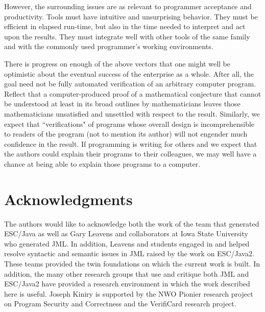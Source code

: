 \documentclass{acm_proc_article-sp}
\begin{document}
However, the surrounding issues are as relevant to programmer acceptance and
productivity.  Tools must have intuitive and unsurprising behavior. They must be efficient
in elapsed run-time, but also in the time needed to interpret and act upon the results.
They must integrate well with other tools of the same family and with the commonly used
programmer's working environments. 

There is progress on enough of the above vectors that one might well be optimistic about the
eventual success of the enterprise as a whole.  After all, the goal need not be fully
automated verification of an
arbitrary computer program.  Reflect that a computer-produced proof
of a mathematical conjecture that cannot be understood at least in its broad outlines by
mathematicians leaves those mathematicians unsatisfied and unsettled with respect to the
result.  Similarly, we expect that ``verifications" of programs whose overall
design is incomprehensible
to readers of the program (not to mention its author) will not engender much confidence
in the result.  If programming is writing for others and we expect that the authors could 
explain their programs to their colleagues, we may well have a chance at being able to explain those programs to a computer.



\section{Acknowledgments}
The authors would like to acknowledge both the work of the team that
generated ESC/Java as well as Gary Leavens and collaborators at Iowa
State University who generated JML.  In addition, Leavens and students
engaged in and helped resolve syntactic and semantic issues in JML
raised by the work on ESC/Java2.  These teams provided the twin
foundations on which the current work is built.  In addition, the many
other research groups that use and critique both JML and ESC/Java2
have provided a research environment in which the work described here
is useful.  Joseph Kiniry is supported by the NWO Pionier research
project on Program Security and Correctness and the VerifiCard
research project.

%

  

%
%
\balancecolumns

\end{document}
